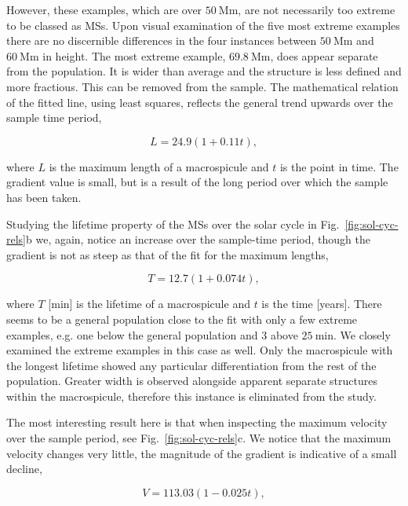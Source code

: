 However, these examples, which are over $50\ \textrm{Mm}$, are not necessarily too extreme to be classed as MSs. Upon visual examination of the five most extreme examples there are no discernible differences in the four instances between $50\ \textrm{Mm}$ and $60\ \textrm{Mm}$ in height. The most extreme example, $69.8\ \textrm{Mm}$, does appear separate from the population. It is wider than average and the structure is less defined and more fractious. This can be removed from the sample. The mathematical relation of the fitted line, using least squares, reflects the general trend upwards over the sample time period, 

\begin{equation}
L = 24.9(1 + 0.11t),
\end{equation}

\noindent where $L$ is the maximum length of a macrospicule and $t$ is the point in time. The gradient value is small, but is a result of the long period over which the sample has been taken.

Studying the lifetime property of the MSs over the solar cycle in Fig.~\ref{fig:sol-cyc-rels}b we, again, notice an increase over the sample-time period, though the gradient is not as steep as that of the fit for the maximum lengths, 

\begin{equation}
T = 12.7(1 + 0.074t),
\end{equation}

\noindent where $T$ [min] is the lifetime of a macrospicule and $t$ is the time [years]. There seems to be a general population close to the fit with only a few extreme examples, e.g. one below the general population and 3 above $25\ \textrm{min}$. We closely examined the extreme examples in this case as well. Only the macrospicule with the longest lifetime showed any particular differentiation from the rest of the population. Greater width is observed alongside apparent separate structures within the macrospicule, therefore this instance is eliminated from the study.

The most interesting result here is that when inspecting the maximum velocity over the sample period, see Fig.~\ref{fig:sol-cyc-rels}c. We notice that the maximum velocity changes very little, the magnitude of the gradient is indicative of a small decline, 

\begin{equation}
V = 113.03(1 - 0.025t),
\end{equation}

